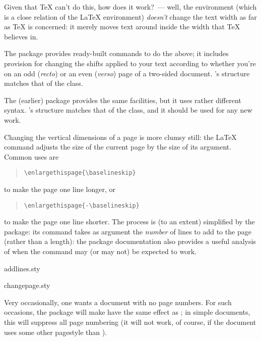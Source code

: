 Given that \TeX{} can't do this, how does it work?~--- well, the
environment (which is a close relation of the \LaTeX{}
 environment) \emph{doesn't} change the text width
as far as \TeX{} is concerned: it merely moves text around inside the
width that \TeX{} believes in.

The  package provides ready-built commands to do
the above; it includes provision for changing the shifts applied to
your text according to whether you're on an odd (\emph{recto}) or an
even (\emph{verso}) page of a two-sided document.
's structure matches that of the 
class.

The (earlier) package  provides the same facilities,
but it uses rather different syntax.  's structure
matches that of the  class, and it should be used for
any new work.

Changing the vertical dimensions of a page is more clumsy still: the
\LaTeX{} command  adjusts the size of the current
page by the size of its argument.  Common uses are
\begin{quote}
\begin{verbatim}
\enlargethispage{\baselineskip}
\end{verbatim}
\end{quote}
to make the page one line longer, or
\begin{quote}
\begin{verbatim}
\enlargethispage{-\baselineskip}
\end{verbatim}
\end{quote}
to make the page one line shorter.  The process is (to an extent)
simplified by the  package: its 
command takes as argument the \emph{number} of lines to add to the
page (rather than a length): the package documentation also provides a
useful analysis of when the command may (or may not) be expected to
work.
\begin{ctanrefs}
\item[addlines.sty]
\item[changepage.sty]
\end{ctanrefs}


Very occasionally, one wants a document with no page numbers.  For
such occasions, the package  will make
 have the same effect as
; in simple documents, this will suppress
all page numbering (it will not work, of course, if the document uses
some other pagestyle than ).

